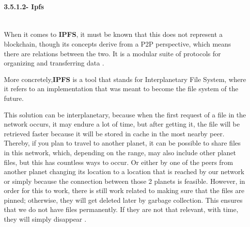 \paragraph{3.5.1.2- Ipfs}\mbox{}\\
When it comes to \textbf{IPFS}, it must be known that this does not represent a blockchain, though its concepts derive from a 
P2P perspective, which means there are relations between the two. It is a modular suite of protocols for organizing and transferring 
data \cite{ipfs}.

More concretely,\textbf{IPFS} is a tool that stands for Interplanetary File System, where it refers to an implementation that was meant 
to become the file system of the future.

This solution can be interplanetary, because when the first request of a file in the network occurs, it may endure a lot of time, but 
after getting it, the file will be retrieved faster because it will be stored in cache in the most nearby peer. Thereby, if you plan to 
travel to another planet, it can be possible to share files in this network, which, depending on the range, may also include other planet 
files, but this has countless ways to occur. Or either by one of the peers from another planet changing its location to a location that is 
reached by our network or simply because the connection between those 2 planets is feasible. However, in order for this to work, there is 
still work related to making sure that the files are pinned; otherwise, they will get deleted later by garbage collection. This ensures 
that we do not have files permanently. If they are not that relevant, with time, they will simply disappear \cite{ipfs-overview}. 

